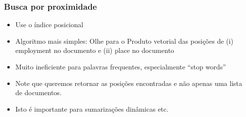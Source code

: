 \documentclass[compress]{beamer}
\def\term#1{{\sc #1}}   %
\begin{document}
\begin{frame}
\frametitle{Busca por proximidade}
\begin{itemize}[<+->]
\item Use o índice posicional
\item Algoritmo mais simples: Olhe para o Produto vetorial das 
posições de (i) \term{employment} no documento e (ii)
  \term{place} no documento
\item Muito ineficiente para palavras frequentes, especialmente ``stop 
words''
\item Note que queremos retornar as posições encontradas e não apenas 
uma lista de documentos.
\item Isto é importante para sumarizações dinâmicas etc.
\end{itemize}
\end{frame}
\end{document}
